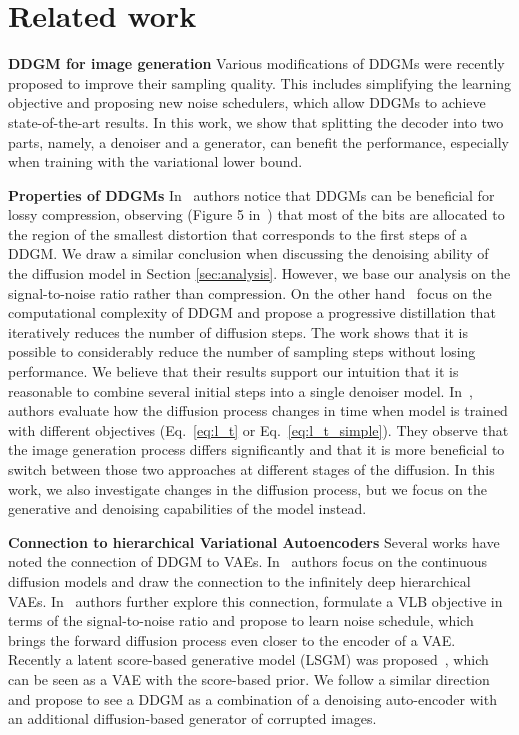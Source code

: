 \section{Related work}

\textbf{DDGM for image generation} 
Various modifications of DDGMs were recently proposed to improve their sampling quality. This includes simplifying the learning objective and proposing new noise schedulers, which allow DDGMs to achieve state-of-the-art results. In this work, we show that splitting the decoder into two parts, namely, a denoiser and a generator, can benefit the performance, especially when training with the variational lower bound.

\textbf{Properties of DDGMs} 
In~\citet{ho2020denoising} authors notice that DDGMs can be beneficial for lossy compression, observing (Figure 5 in~\citet{ho2020denoising}) that most of the bits are allocated to the region of the smallest distortion that corresponds to the first steps of a DDGM. 
We draw a similar conclusion when discussing the denoising ability of the diffusion model in Section \ref{sec:analysis}. However, we base our analysis on the signal-to-noise ratio rather than compression. On the other hand~\citet{salimans2022progressive} focus on the computational complexity of DDGM and propose a progressive distillation that iteratively reduces the number of diffusion steps. The work shows that it is possible to considerably reduce the number of sampling steps without losing performance. We believe that their results support our intuition that it is reasonable to combine several initial steps into a single denoiser model. In~\cite{benny2022dynamic}, authors evaluate how the diffusion process changes in time when model is trained with different objectives (Eq.~\ref{eq:l_t} or Eq.~\ref{eq:l_t_simple}). They observe that the image generation process differs significantly and that it is more beneficial to switch between those two approaches at different stages of the diffusion. 
In this work, we also investigate changes in the diffusion process, but we focus on the generative and denoising capabilities of the model instead.

\textbf{Connection to hierarchical Variational Autoencoders} Several works have noted the connection of DDGM to VAEs. In~\citet{huang2021variational} authors focus on the continuous diffusion models and draw the connection to the infinitely deep hierarchical VAEs. In~\citet{kingma2021variational} authors further explore this connection, formulate a VLB objective in terms of the signal-to-noise ratio and propose to learn noise schedule, which brings the forward diffusion process even closer to the encoder of a VAE. 
Recently a latent score-based generative model (LSGM) was proposed~\cite{vahdat2021score}, which can be seen as a VAE with the score-based prior. We follow a similar direction and propose to see a DDGM as a combination of a denoising auto-encoder with an additional diffusion-based generator of corrupted images.
